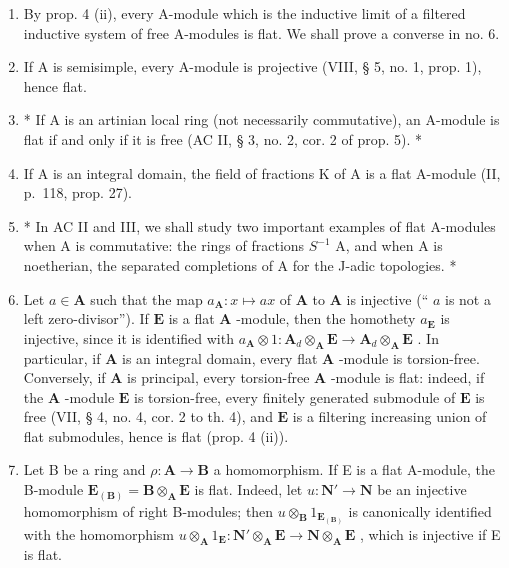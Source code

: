 \begin{enumerate}
\def\labelenumi{\arabic{enumi})}
\setcounter{enumi}{1}
\item
  By prop. 4 (ii), every A-module which is the inductive limit of a filtered inductive system of free A-modules is flat. We shall prove a converse in no. 6.
\item
  If A is semisimple, every A-module is projective (VIII, § 5, no. 1, prop. 1), hence flat.
\item
  * If A is an artinian local ring (not necessarily commutative), an A-module is flat if and only if it is free (AC II, § 3, no. 2, cor. 2 of prop. 5). *
\item
  If A is an integral domain, the field of fractions K of A is a flat A-module (II, p.~118, prop. 27).
\item
  * In AC II and III, we shall study two important examples of flat A-modules when A is commutative: the rings of fractions \(S^{-1}\) A, and when A is noetherian, the separated completions of A for the J-adic topologies. *
\item
  Let \(a \in \mathbf{A}\) such that the map \(a_{\mathbf{A}}: x \mapsto ax\) of \(\mathbf{A}\) to \(\mathbf{A}\) is injective (“ \(a\) is not a left zero-divisor”). If \(\mathbf{E}\) is a flat \(\mathbf{A}\) -module, then the homothety \(a_{\mathbf{E}}\) is injective, since it is identified with \(a_{\mathbf{A}} \otimes 1: \mathbf{A}_{d} \otimes_{\mathbf{A}} \mathbf{E} \to \mathbf{A}_{d} \otimes_{\mathbf{A}} \mathbf{E}\) . In particular, if \(\mathbf{A}\) is an integral domain, every flat \(\mathbf{A}\) -module is torsion-free. Conversely, if \(\mathbf{A}\) is principal, every torsion-free \(\mathbf{A}\) -module is flat: indeed, if the \(\mathbf{A}\) -module \(\mathbf{E}\) is torsion-free, every finitely generated submodule of \(\mathbf{E}\) is free (VII, § 4, no. 4, cor. 2 to th. 4), and \(\mathbf{E}\) is a filtering increasing union of flat submodules, hence is flat (prop. 4 (ii)).
\item
  Let B be a ring and \(\rho: \mathbf{A} \to \mathbf{B}\) a homomorphism. If E is a flat A-module, the B-module \(\mathbf{E}_{(\mathbf{B})} = \mathbf{B} \otimes_{\mathbf{A}} \mathbf{E}\) is flat. Indeed, let \(u: \mathbf{N}' \to \mathbf{N}\) be an injective homomorphism of right B-modules; then \(u \otimes_{\mathbf{B}} 1_{\mathbf{E}_{(\mathbf{B})}}\) is canonically identified with the homomorphism \(u \otimes_{\mathbf{A}} 1_{\mathbf{E}}: \mathbf{N}' \otimes_{\mathbf{A}} \mathbf{E} \to \mathbf{N} \otimes_{\mathbf{A}} \mathbf{E}\) , which is injective if E is flat.

\end{enumerate}
